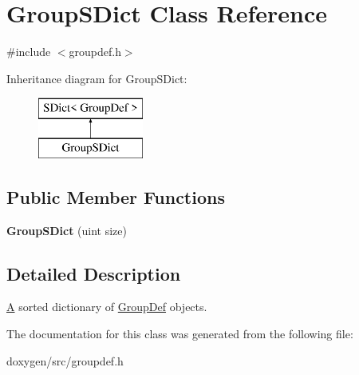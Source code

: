 \hypertarget{class_group_s_dict}{}\section{Group\+S\+Dict Class Reference}
\label{class_group_s_dict}


{\ttfamily \#include $<$groupdef.\+h$>$}

Inheritance diagram for Group\+S\+Dict\+:\begin{figure}[H]
\begin{center}
\leavevmode
\includegraphics[height=2.000000cm]{class_group_s_dict}
\end{center}
\end{figure}
\subsection*{Public Member Functions}
\begin{DoxyCompactItemize}
\item 
\mbox{\label{class_group_s_dict_a30327d982dd403537413d1fd52f630d0}} 
{\bfseries Group\+S\+Dict} (uint size)
\end{DoxyCompactItemize}


\subsection{Detailed Description}
\mbox{\hyperlink{class_a}{A}} sorted dictionary of \mbox{\hyperlink{class_group_def}{Group\+Def}} objects. 

The documentation for this class was generated from the following file\+:\begin{DoxyCompactItemize}
\item 
doxygen/src/groupdef.\+h\end{DoxyCompactItemize}
